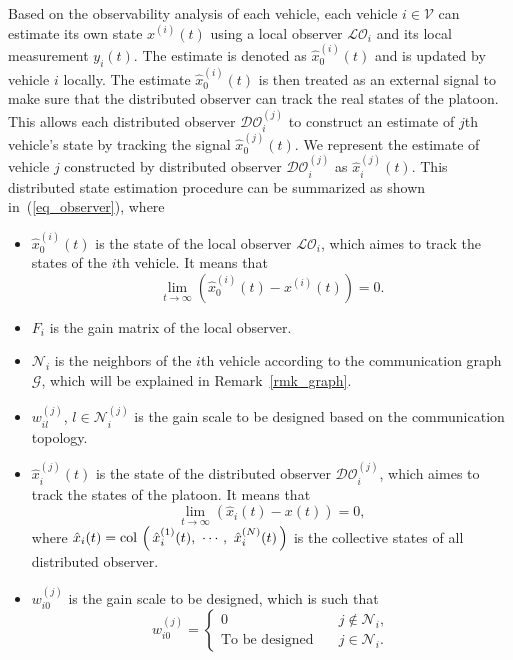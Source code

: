 \documentclass[letterpaper, 10pt, conference]{ieeeconf}  %
\def\col#1{\mathop{{\rm col}\,\left(\,#1\,\right)}}
\def\eqref#1{(\ref{#1})}
\def\V{\mathcal{V}} %
\def\G{\mathcal{G}} %
\def\N{\mathcal{N}} %
\def\LO{\mathcal{LO}} %
\def\DO{\mathcal{DO}} %
\begin{document}
Based on the observability analysis of each vehicle, each vehicle $i \in \V$ can estimate its own state $x^{(i)}(t)$ using a local observer $\LO_{i}$ and its local measurement $y_i(t)$. 
The estimate is denoted as $\hat{x}_{0}^{(i)}(t)$ and is updated by vehicle $i$ locally. 
The estimate $\hat{x}_{0}^{(i)}(t)$ is then treated as an external signal to make sure that the distributed observer can track the real states of the platoon.
This allows each distributed observer $\DO_i^{(j)}$ to construct an estimate of $j$th vehicle's state by tracking the signal $\hat{x}_{0}^{(j)}(t)$. 
We represent the estimate of vehicle $j$ constructed by distributed observer $\DO_i^{(j)}$ as $\hat{x}_i^{(j)}(t)$. 
This distributed state estimation procedure can be summarized as shown in~\eqref{eq_observer}, 
where 
\begin{itemize}
    \item $\hat{x}_{0}^{(i)}(t)$ is the state of the local observer $\LO_{i}$, which aimes to track the states of the $i$th vehicle. It means that
    \begin{equation}
        \lim_{t \rightarrow \infty} \left( \hat{x}_{0}^{(i)}(t) - x^{(i)}(t) \right)= 0. 
        \label{eq_hatx_0}
    \end{equation}
    \item $F_{i}$ is the gain matrix of the local observer. 
    \item ${\N}_{i}$ is the neighbors of the $i$th vehicle according to the communication graph $\G$, which will be explained in Remark~\ref{rmk_graph}.
    \item {$w_{i l}^{(j)}$, $l \in \N_{i}^{(j)}$ is the gain scale to be designed based on the communication topology.}
    \item $\hat{x}^{(j)}_i(t)$ is the state of the distributed observer $\DO_{i}^{(j)}$, which aimes to track the states of the platoon. It means that 
    \begin{equation}
        \lim_{t \rightarrow \infty} \left( \hat{x}_i(t) - x(t) \right)= 0,
        \label{eq_hatx_i}
    \end{equation}
    where $\hat{x}_i(t) = \col{\hat{x}^{(1)}_i(t) , \ \cdots , \ \hat{x}^{(N)}_i(t) }$ is the collective states of all distributed observer.
    \item $w_{i 0}^{(j)}$ is the gain scale to be designed, which is such that
    \begin{equation}
        w_{i 0}^{(j)} = \begin{cases}
            0 \quad &j \notin \N_{i}, \\
            \text{To be designed}  \quad &j \in \N_{i}.
        \end{cases}
    \end{equation}
\end{itemize}
\end{document}
